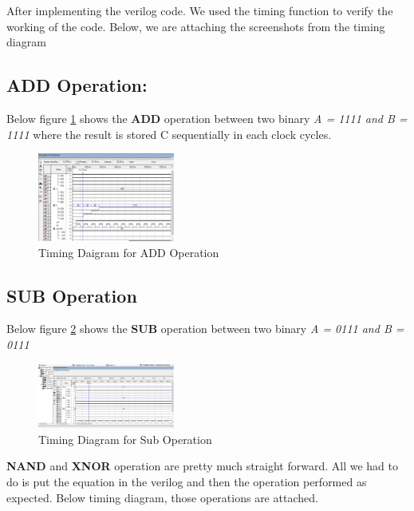 After implementing the verilog code.
We used the timing function to verify the working of the code.
Below, we are attaching the screenshots from the timing diagram

\subsection{ADD Operation:}\label{subsec:add-operation}
Below figure \ref{fig:timing add} shows the \textbf{ADD} operation between two binary \textit{A = 1111 and B = 1111}
where the result is stored C sequentially in each clock cycles.
\begin{figure}[H]
    \begin{center}
        \includegraphics[width = 0.4\textwidth]{figures/add}
    \end{center}
    \caption{Timing Daigram for ADD Operation}
    \label{fig:timing add}
\end{figure}

\subsection{SUB Operation}\label{subsec:sub-operation}
Below figure \ref{fig:timing sub} shows the \textbf{SUB} operation between two binary \textit{A = 0111 and B = 0111}
\begin{figure}[H]
    \begin{center}
        \includegraphics[width = 0.4\textwidth]{figures/sub_operation}
    \end{center}
    \caption{Timing Diagram for Sub Operation}
    \label{fig:timing sub}
\end{figure}

\textbf{NAND} and \textbf{XNOR} operation are pretty much straight forward.
All we had to do is put the equation in the verilog and then the
operation performed as expected.
Below timing diagram, those operations are attached.

